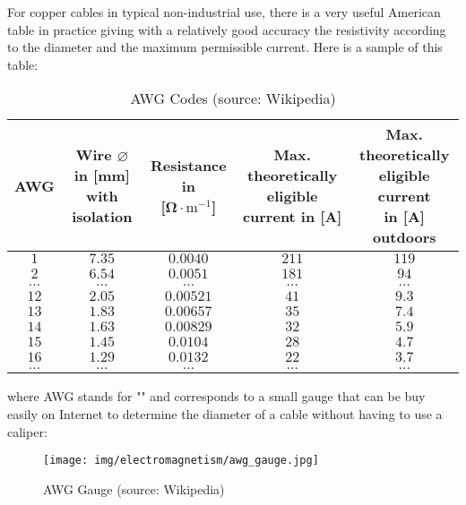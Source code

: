 	For copper cables in typical non-industrial use, there is a very useful American table in practice giving with a relatively good accuracy the resistivity according to the diameter and the maximum permissible current. Here is a sample of this table:
	\begin{table}[H]
		\begin{center}
				\begin{tabular}{|c|c|c|c|c|}
					\hline
					\multicolumn{1}{c}{\cellcolor{black!30}\textbf{AWG}} & 
	  \multicolumn{1}{c}{\cellcolor{black!30}\parbox{3cm}{\textbf{Wire $\varnothing$ in [mm]} \\ \textbf{with isolation}}} & \multicolumn{1}{c}{\cellcolor{black!30}\parbox{2.5cm}{\textbf{Resistance in} \\ \textbf{[$\boldsymbol{\Omega}\cdot\text{m}^{-1}$]}}}  & \multicolumn{1}{c}{\cellcolor{black!30}\parbox{4.7cm}{\textbf{Max. theoretically eligible} \\ \textbf{current in [A]}}} & \multicolumn{1}{c}{\cellcolor{black!30}\parbox{3.5cm}{\textbf{Max. theoretically} \\ \textbf{eligible current} \\ \textbf{in [A] outdoors}}}  \\ \hline
					$1$ & $7.35$ & $0.0040$ & $211$ & $119$ \\ \hline
					$2$ & $6.54$ & $0.0051$ & $181$ & $94$ \\ \hline
					$\ldots$ & $\ldots$ & $\ldots$ & $\ldots$ & $\ldots$ \\ 	\hline
					$12$ & $2.05$ & $0.00521$ & $41$ & $9.3$ \\ \hline
					$13$ & $1.83$ & $0.00657$ & $35$ & $7.4$ \\ \hline
					$14$ & $1.63$ & $0.00829$ & $32$ & $5.9$ \\ \hline
					$15$ & $1.45$ & $0.0104$ & $28$ & $4.7$ \\ \hline
					$16$ & $1.29$ & $0.0132$ & $22$ & $3.7$ \\ \hline
					$\ldots$ & $\ldots$ & $\ldots$ & $\ldots$ & $\ldots$ \\ \hline
			\end{tabular}
		\end{center}
		\caption[AWG Codes]{AWG Codes (source: Wikipedia)}
	\end{table}
	where AWG stands for "" and corresponds to a small gauge that can be buy easily on Internet to determine the diameter of a cable without having to use a caliper:
	\begin{figure}[H]
		\centering
		\texttt{[image: img/electromagnetism/awg\_gauge.jpg]}
		\caption[AWG Gauge]{AWG Gauge (source: Wikipedia)}
	\end{figure}
	
